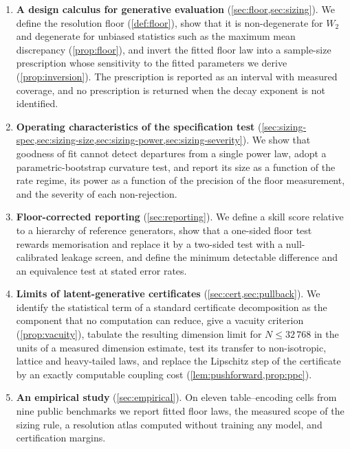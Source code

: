\documentclass[twoside,11pt]{article}
\theoremstyle{plain}
\theoremstyle{definition}
\theoremstyle{remark}
\newcommand{\Wtwo}{\ensuremath{W_2}}
\begin{document}
\begin{enumerate}[label=(\roman*), itemsep=4pt]
\item \textbf{A design calculus for generative evaluation}
  (\cref{sec:floor,sec:sizing}). We define the resolution floor
  (\cref{def:floor}), show that it is non-degenerate for $\Wtwo$ and
  degenerate for unbiased statistics such as the maximum mean discrepancy
  (\cref{prop:floor}), and invert the fitted floor law into a sample-size
  prescription whose sensitivity to the fitted parameters we derive
  (\cref{prop:inversion}). The prescription is reported as an interval with
  measured coverage, and no prescription is returned when the decay
  exponent is not identified.
\item \textbf{Operating characteristics of the specification test}
  (\cref{sec:sizing-spec,sec:sizing-size,sec:sizing-power,sec:sizing-severity}).
  We show that goodness of fit cannot detect departures from a single power
  law, adopt a parametric-bootstrap \citep{efron1979} curvature test, and report its size as a
  function of the rate regime, its power as a function of the precision of
  the floor measurement, and the severity of each non-rejection.
\item \textbf{Floor-corrected reporting} (\cref{sec:reporting}). We define
  a skill score relative to a hierarchy of reference generators, show that
  a one-sided floor test rewards memorisation and replace it by a two-sided
  test with a null-calibrated leakage screen, and define the minimum
  detectable difference and an equivalence test at stated error rates.
\item \textbf{Limits of latent-generative certificates}
  (\cref{sec:cert,sec:pullback}). We identify the statistical term of a standard
  certificate decomposition as the component that no computation can
  reduce, give a vacuity criterion (\cref{prop:vacuity}), tabulate the
  resulting dimension limit for $N \leq 32\,768$ in the units of a measured
  dimension estimate, test its transfer to non-isotropic, lattice and
  heavy-tailed laws, and replace the Lipschitz step of the certificate by
  an exactly computable coupling cost (\cref{lem:pushforward,prop:ppc}).
\item \textbf{An empirical study} (\cref{sec:empirical}). On eleven
  table--encoding cells from nine public benchmarks we report fitted floor
  laws, the measured scope of the sizing rule, a resolution atlas computed
  without training any model, and certification margins.
\end{enumerate}
\end{document}

